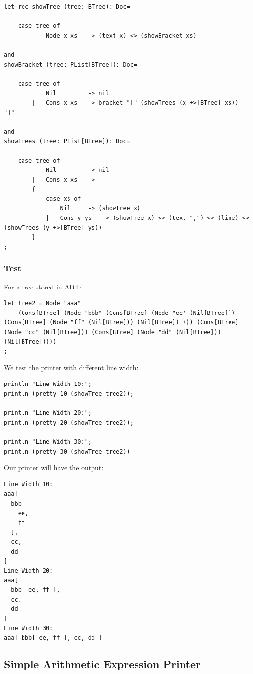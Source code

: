 \begin{lstlisting}
let rec showTree (tree: BTree): Doc=

    case tree of
            Node x xs   -> (text x) <> (showBracket xs)

and
showBracket (tree: PList[BTree]): Doc=

    case tree of
            Nil         -> nil
        |   Cons x xs   -> bracket "[" (showTrees (x +>[BTree] xs)) "]"

and
showTrees (tree: PList[BTree]): Doc=

    case tree of
            Nil         -> nil
        |   Cons x xs   ->
        {
            case xs of
                Nil     -> (showTree x)
            |   Cons y ys   -> (showTree x) <> (text ",") <> (line) <> (showTrees (y +>[BTree] ys))
        }
;
\end{lstlisting}

\subsubsection{Test}

For a tree stored in ADT:
\begin{lstlisting}
let tree2 = Node "aaa"
    (Cons[BTree] (Node "bbb" (Cons[BTree] (Node "ee" (Nil[BTree])) (Cons[BTree] (Node "ff" (Nil[BTree])) (Nil[BTree]) ))) (Cons[BTree] (Node "cc" (Nil[BTree])) (Cons[BTree] (Node "dd" (Nil[BTree])) (Nil[BTree]))))
;
\end{lstlisting}

We test the printer with different line width:
\begin{lstlisting}
println "Line Width 10:";
println (pretty 10 (showTree tree2));

println "Line Width 20:";
println (pretty 20 (showTree tree2));

println "Line Width 30:";
println (pretty 30 (showTree tree2))
\end{lstlisting}

Our printer will have the output:
\begin{lstlisting}
Line Width 10:
aaa[
  bbb[
    ee,
    ff
  ],
  cc,
  dd
]
Line Width 20:
aaa[
  bbb[ ee, ff ],
  cc,
  dd
]
Line Width 30:
aaa[ bbb[ ee, ff ], cc, dd ]
\end{lstlisting}

\subsection{Simple Arithmetic Expression Printer}


